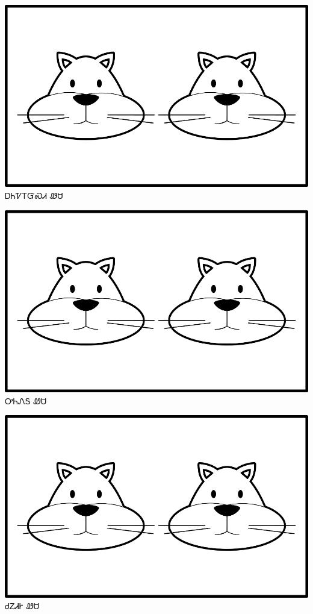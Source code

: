 \documentclass[avery5371]{flashcards}%
\begin{document}
\begin{flashcard}{
\includegraphics[width=0.95\columnwidth,height=.51\columnwidth,keepaspectratio]{../artwork/for-colors/wesa-anitali}
}
\Huge ᎠᏂᏤᎢᏳᏍᏗ ᏪᏌ
\end{flashcard}

\begin{flashcard}{
\includegraphics[width=0.95\columnwidth,height=.51\columnwidth,keepaspectratio]{../artwork/for-colors/wesa-anitali}
}
\Huge ᎤᏂᏁᎦ ᏪᏌ
\end{flashcard}

\begin{flashcard}{
\includegraphics[width=0.95\columnwidth,height=.51\columnwidth,keepaspectratio]{../artwork/for-colors/wesa-anitali}
}
\Huge ᏧᏃᏗᎨ ᏪᏌ
\end{flashcard}
\end{document}
